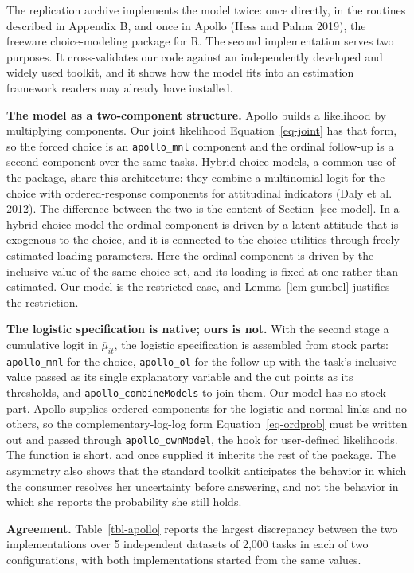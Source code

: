 \documentclass[
  letterpaper,
  DIV=11,
  numbers=noendperiod]{scrartcl}
\theoremstyle{plain}
\theoremstyle{plain}
\theoremstyle{plain}
\theoremstyle{remark}
\begin{document}
The replication archive implements the model twice: once directly, in
the routines described in Appendix B, and once in Apollo (Hess and Palma
2019), the freeware choice-modeling package for R. The second
implementation serves two purposes. It cross-validates our code against
an independently developed and widely used toolkit, and it shows how the
model fits into an estimation framework readers may already have
installed.

\textbf{The model as a two-component structure.} Apollo builds a
likelihood by multiplying components. Our joint likelihood
Equation~\ref{eq-joint} has that form, so the forced choice is an
\texttt{apollo\_mnl} component and the ordinal follow-up is a second
component over the same tasks. Hybrid choice models, a common use of the
package, share this architecture: they combine a multinomial logit for
the choice with ordered-response components for attitudinal indicators
(Daly et al. 2012). The difference between the two is the content of
Section~\ref{sec-model}. In a hybrid choice model the ordinal component
is driven by a latent attitude that is exogenous to the choice, and it
is connected to the choice utilities through freely estimated loading
parameters. Here the ordinal component is driven by the inclusive value
of the same choice set, and its loading is fixed at one rather than
estimated. Our model is the restricted case, and Lemma~\ref{lem-gumbel}
justifies the restriction.

\textbf{The logistic specification is native; ours is not.} With the
second stage a cumulative logit in \(\overline{\mu}_{it}\), the logistic
specification is assembled from stock parts: \texttt{apollo\_mnl} for
the choice, \texttt{apollo\_ol} for the follow-up with the task's
inclusive value passed as its single explanatory variable and the cut
points as its thresholds, and \texttt{apollo\_combineModels} to join
them. Our model has no stock part. Apollo supplies ordered components
for the logistic and normal links and no others, so the
complementary-log-log form Equation~\ref{eq-ordprob} must be written out
and passed through \texttt{apollo\_ownModel}, the hook for user-defined
likelihoods. The function is short, and once supplied it inherits the
rest of the package. The asymmetry also shows that the standard toolkit
anticipates the behavior in which the consumer resolves her uncertainty
before answering, and not the behavior in which she reports the
probability she still holds.

\textbf{Agreement.} Table~\ref{tbl-apollo} reports the largest
discrepancy between the two implementations over 5 independent datasets
of 2,000 tasks in each of two configurations, with both implementations
started from the same values.
\end{document}
